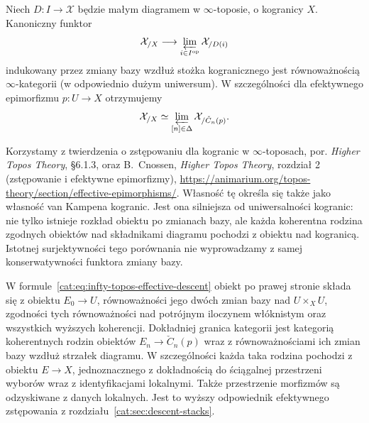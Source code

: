 \begin{twierdzenie}\label{cat:thm:infty-topos-effective-descent}
Niech $D:I\to\mathcal X$ będzie małym diagramem w $\infty$-toposie, o kogranicy $X$. Kanoniczny funktor
\[
 \mathcal X_{/X}\longrightarrow
 \varprojlim_{i\in I^{\mathrm{op}}}\mathcal X_{/D(i)}
\]
indukowany przez zmiany bazy wzdłuż stożka kogranicznego jest równoważnością $\infty$-kategorii (w odpowiednio dużym uniwersum). W szczególności dla efektywnego epimorfizmu $p:U\to X$ otrzymujemy
\begin{equation}\label{cat:eq:infty-topos-effective-descent}
 \mathcal X_{/X}\simeq
 \varprojlim_{[n]\in\Delta}\mathcal X_{/\check C_n(p)}.
\end{equation}
\end{twierdzenie}

Korzystamy z twierdzenia o zstępowaniu dla kogranic w $\infty$-toposach, por. \emph{Higher Topos Theory}, \S6.1.3, oraz B.~Cnossen, \emph{Higher Topos Theory}, rozdział 2 (zstępowanie i efektywne epimorfizmy), \url{https://animarium.org/topos-theory/section/effective-epimorphisms/}. Własność tę określa się także jako własność van Kampena kogranic. Jest ona silniejsza od uniwersalności kogranic: nie tylko istnieje rozkład obiektu po zmianach bazy, ale każda koherentna rodzina zgodnych obiektów nad składnikami diagramu pochodzi z obiektu nad kogranicą. Istotnej surjektywności tego porównania nie wyprowadzamy z samej konserwatywności funktora zmiany bazy.

W formule~\eqref{cat:eq:infty-topos-effective-descent} obiekt po prawej stronie składa się z obiektu $E_0\to U$, równoważności jego dwóch zmian bazy nad $U\times_X U$, zgodności tych równoważności nad potrójnym iloczynem włóknistym oraz wszystkich wyższych koherencji. Dokładniej granica kategorii jest kategorią koherentnych rodzin obiektów $E_n\to\check C_n(p)$ wraz z równoważnościami ich zmian bazy wzdłuż strzałek diagramu. W szczególności każda taka rodzina pochodzi z obiektu $E\to X$, jednoznacznego z dokładnością do ściągalnej przestrzeni wyborów wraz z identyfikacjami lokalnymi. Także przestrzenie morfizmów są odzyskiwane z danych lokalnych. Jest to wyższy odpowiednik efektywnego zstępowania z rozdziału~\ref{cat:sec:descent-stacks}.

